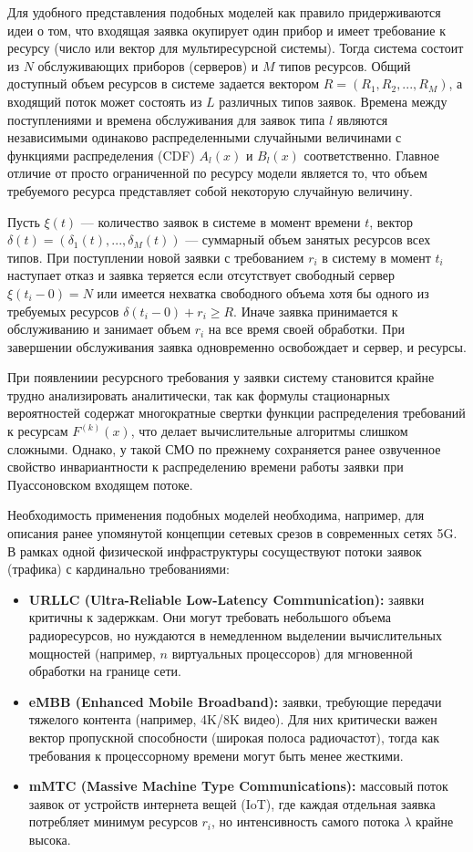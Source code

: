 Для удобного представления подобных моделей как правило придерживаются идеи о том, что входящая заявка окупирует один прибор и имеет требование к ресурсу (число или вектор для мультиресурсной системы). Тогда система состоит из $N$ обслуживающих приборов (серверов) и $M$ типов ресурсов. Общий доступный объем ресурсов в системе задается вектором $R=(R_{1},R_{2},...,R_{M})$, а входящий поток может состоять из $L$ различных типов заявок. Времена между поступлениями и времена обслуживания для заявок типа $l$ являются независимыми одинаково распределенными случайными величинами с функциями распределения (CDF) $A_{l}(x)$ и $B_{l}(x)$ соответственно. Главное отличие от просто ограниченной по ресурсу модели является то, что объем требуемого ресурса представляет собой некоторую случайную величину. 

Пусть $\xi(t)$ --- количество заявок в системе в момент времени $t$, вектор $\delta(t)=(\delta_{1}(t),...,\delta_{M}(t))$ --- суммарный объем занятых ресурсов всех типов. При поступлении новой заявки с требованием $r_{i}$ в систему в момент $t_{i}$ наступает отказ и заявка теряется если отсутствует свободный сервер $\xi(t_{i}-0) = N$ или имеется нехватка свободного объема хотя бы одного из требуемых ресурсов $\delta(t_{i}-0) + r_{i} \ge R$. Иначе заявка принимается к обслуживанию и занимает объем $r_{i}$ на все время своей обработки. При завершении обслуживания заявка одновременно освобождает и сервер, и ресурсы.

При появлениии ресурсного требования у заявки систему становится крайне трудно анализировать аналитически, так как формулы стационарных вероятностей содержат многократные свертки функции распределения требований к ресурсам $F^{(k)}(x)$, что делает вычислительные алгоритмы слишком сложными. Однако, у такой СМО по прежнему сохраняется ранее озвученное свойство инвариантности к распределению времени работы заявки при Пуассоновском входящем потоке. 

Необходимость применения подобных моделей необходима, например, для описания ранее упомянутой концепции сетевых срезов в современных сетях 5G. В рамках одной физической инфраструктуры сосуществуют потоки заявок (трафика) с кардинально требованиями:
\begin{itemize}
    \item \textbf{URLLC (Ultra-Reliable Low-Latency Communication):} заявки критичны к задержкам. Они могут требовать небольшого объема радиоресурсов, но нуждаются в немедленном выделении вычислительных мощностей (например, $n$ виртуальных процессоров) для мгновенной обработки на границе сети.
    \item \textbf{eMBB (Enhanced Mobile Broadband):} заявки, требующие передачи тяжелого контента (например, 4K/8K видео). Для них критически важен вектор пропускной способности (широкая полоса радиочастот), тогда как требования к процессорному времени могут быть менее жесткими.
    \item \textbf{mMTC (Massive Machine Type Communications):} массовый поток заявок от устройств интернета вещей (IoT), где каждая отдельная заявка потребляет минимум ресурсов $r_i$, но интенсивность самого потока $\lambda$ крайне высока.
\end{itemize}

